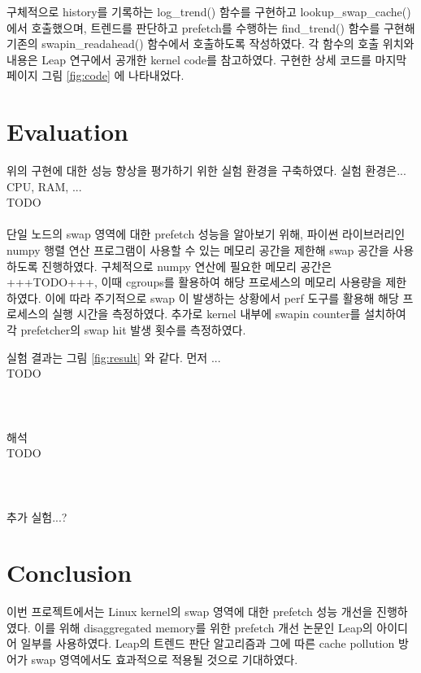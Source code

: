 \documentclass[conference,11pt]{IEEEtran}
\begin{document}
\begin{CJK}{UTF8}{}
    구체적으로 history를 기록하는 log\_trend() 함수를 구현하고 lookup\_swap\_cache() 에서 호출했으며, 트렌드를 판단하고 prefetch를 수행하는 find\_trend() 함수를 구현해 기존의 swapin\_readahead() 함수에서 호출하도록 작성하였다. 각 함수의 호출 위치와 내용은 Leap 연구에서 공개한 kernel code를 참고하였다. 구현한 상세 코드를 마지막 페이지 그림 \ref{fig:code} 에 나타내었다.

    \section{Evaluation} \label{sec:evaluation}

    위의 구현에 대한 성능 향상을 평가하기 위한 실험 환경을 구축하였다. 실험 환경은... CPU, RAM, ... \\
    TODO \\
    \\

    단일 노드의 swap 영역에 대한 prefetch 성능을 알아보기 위해, 파이썬 라이브러리인 numpy 행렬 연산 프로그램이 사용할 수 있는 메모리 공간을 제한해 swap 공간을 사용하도록 진행하였다. 구체적으로 numpy 연산에 필요한 메모리 공간은 +++TODO+++, 이때 cgroups를 활용하여 해당 프로세스의 메모리 사용량을 제한하였다. 이에 따라 주기적으로 swap 이 발생하는 상황에서 perf 도구를 활용해 해당 프로세스의 실행 시간을 측정하였다. 추가로 kernel 내부에 swapin counter를 설치하여 각 prefetcher의 swap hit 발생 횟수를 측정하였다.

    실험 결과는 그림 \ref{fig:result} 와 같다. 먼저 ... \\
    TODO \\
    \\
    \\
    \\
    해석 \\
    TODO \\
    \\
    \\
    \\
    추가 실험...?

    \section{Conclusion} \label{sec:conclusion}

    이번 프로젝트에서는 Linux kernel의 swap 영역에 대한 prefetch 성능 개선을 진행하였다. 이를 위해 disaggregated memory를 위한 prefetch 개선 논문인 Leap의 아이디어 일부를 사용하였다. Leap의 트렌드 판단 알고리즘과 그에 따른 cache pollution 방어가 swap 영역에서도 효과적으로 적용될 것으로 기대하였다.


\end{CJK}
\end{document}
